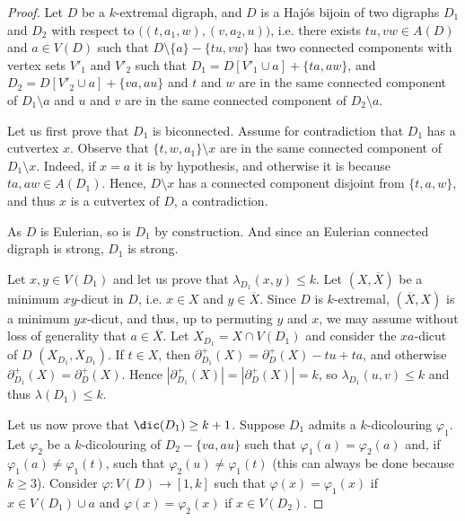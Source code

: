 \begin{proof} 
    Let $D$ be a $k$-extremal digraph, and $D$ is a Haj\'os bijoin of two digraphs $D_1$ and $D_2$ with respect to $\big((t,a_1,w), (v,a_2, u)\big)$, i.e. there exists $tu,vw \in A(D)$ and $a \in V(D)$ such that $D\setminus \{a\} - \{tu,vw\}$ has two connected components with vertex sets $V'_1$ and $V'_2$ such that $D_1=D[V'_1 \cup a] + \{ta,aw\}$, and $D_2= D[V'_2 \cup a] + \{va,au\}$ and $t$ and $w$ are in the same connected component of $D_1\setminus a$ and  $u$ and $v$ are in the same connected component of $D_2\setminus a$. 
    \smallskip 

    
    Let us first prove that $D_1$ is biconnected. Assume for contradiction that $D_1$ has a cutvertex $x$. Observe that $\{t,w,a_1\} \setminus x$ are in the same connected component of $D_1 \setminus x$. Indeed, if $x=a$ it is by hypothesis, and otherwise it is because $ta, aw \in A(D_1)$. Hence, $D \setminus x$ has a connected component disjoint from $\{t,a,w\}$, and thus $x$ is a cutvertex of $D$, a contradiction.  
    \smallskip 

    As $D$ is Eulerian, so is $D_1$ by construction. And since an Eulerian connected digraph is strong, $D_1$ is strong. 
    \smallskip 
    
    Let $x,y \in V(D_1)$ and let us prove that $\lambda_{D_1}(x,y) \leq k$. 
    Let $(X,\overline{X})$ be a minimum $xy$-dicut in $D$, i.e. $x \in X$ and $y \in \overline{X}$. Since $D$ is $k$-extremal, $(\overline{X}, X)$ is a minimum $yx$-dicut, and thus, up to permuting $y$ and $x$, we may assume without loss of generality that $a \in \overline{X}$. 
    Let $X_{D_1} =X \cap V(D_1)$ and  consider the $xa$-dicut of $D$ $(X_{D_1}, \overline{X}_{D_1})$.  If $t \in X$, then $\partial_{D_1}^+(X) = \partial_D^+(X) -tu + ta$, and otherwise $\partial_{D_1}^+(X) = \partial_D^+(X)$. Hence $|\partial_{D_1}^+(X)| = |\partial_D^+(X)| = k$, so $\lambda_{D_1}(u,v) \leq k$ and thus $\lambda(D_1) \leq k$. 
    \smallskip 
    
    Let us now prove that $\dic(D_1) \geq k + 1$. Suppose $D_1$ admits a $k$-dicolouring $\varphi_1$. Let $\varphi_2$ be a $k$-dicolouring of $D_2 - \{va,au\}$  
    such that $\varphi_1(a) = \varphi_2(a)$ and, if $\varphi_1(a) \neq \varphi_1(t)$, such that $\varphi_2(u) \neq \varphi_1(t)$ (this can always be done because $k \geq 3$). 
    Consider $\varphi : V(D) \to [1,k]$ such that $\varphi(x) = \varphi_1(x)$ if $x \in V(D_1) \cup a$ and $\varphi(x) = \varphi_2(x)$ if $x \in V(D_2)$. 


\end{proof}
